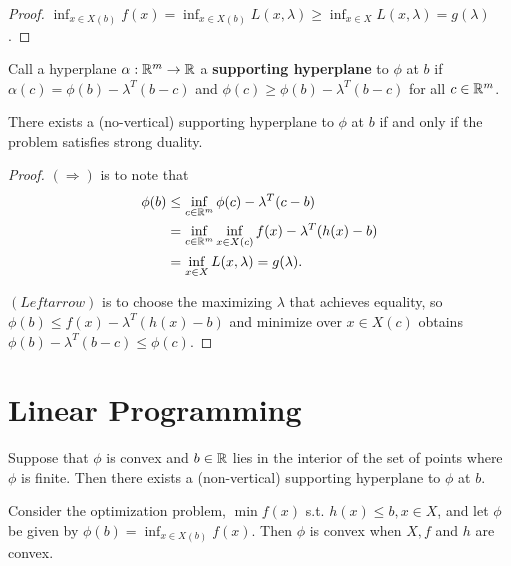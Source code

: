 \begin{proof}
  $\inf_{x \in X(b)} f(x) = \inf_{x \in X(b)} L(x, \lambda) \geq
  \inf_{x \in X} L(x, \lambda) = g(\lambda)$.
\end{proof}

\begin{defn}
  \label{sec:optimization-8}
  Call a hyperplane $\alpha: \mathbb{R}^{m} \rightarrow \mathbb{R}$ a
  \textbf{supporting hyperplane} to $\phi$ at $b$ if $\alpha(c) =
  \phi(b) - \lambda^{T}(b-c)$ and $\phi(c) \geq \phi(b) -
  \lambda^{T}(b-c)$ for all $c \in \mathbb{R}^{m}$.
\end{defn}

\begin{thm}
  \label{sec:optimization-10}
  There exists a (no-vertical) supporting hyperplane to $\phi$ at $b$
  if and only if the problem satisfies strong duality.
\end{thm}

\begin{proof}
  $(\Rightarrow)$ is to note that
  \begin{align}
    \phi(b) &\leq \inf_{c \in \mathbb{R}^{m}} \phi(c) - \lambda^{T}(c - b) \\
    &= \inf_{c \in \mathbb{R}^{m}} \inf_{x \in X(c)} f(x) - \lambda^{T} (h(x) -
    b) \\
    &= \inf_{x \in X} L(x, \lambda) = g(\lambda).
  \end{align}

  $(Leftarrow)$ is to choose the maximizing $\lambda$ that achieves
  equality, so $\phi(b) \leq f(x) - \lambda^{T}(h(x) - b)$ and
  minimize over $x \in X(c)$ obtains $\phi(b) - \lambda^{T}(b-c) \leq
  \phi(c)$.
\end{proof}

\section{Linear Programming}
\label{sec:linear-programming}

\begin{thm}
  \label{sec:linear-programming-1}
  Suppose that $\phi$ is convex and $b \in \mathbb{R}$ lies in the interior of
  the set of points where $\phi$ is finite.  Then there exists a
  (non-vertical) supporting hyperplane to $\phi$ at $b$.
\end{thm}

\begin{thm}
  \label{sec:linear-programming-2}
  Consider the optimization problem, $\min f(x)$ s.t. $h(x) \leq b, x
  \in X$, and let $\phi$ be given by $\phi(b) = \inf_{x \in X(b)}
  f(x)$.  Then $\phi$ is convex when $X, f$ and $h$ are convex.
\end{thm}

